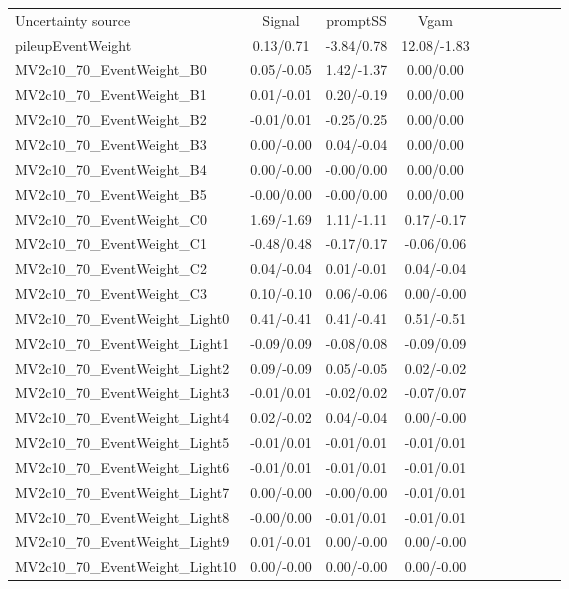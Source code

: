 \begin{table}[h]
\scriptsize
\begin{center}
\begin{tabular}{l|ccccccccc}
\hline
\hline
Uncertainty source &Signal &promptSS &Vgam \\
pileupEventWeight &0.13/0.71 &-3.84/0.78 &12.08/-1.83 \\
MV2c10\_70\_EventWeight\_B0 &0.05/-0.05 &1.42/-1.37 &0.00/0.00 \\
MV2c10\_70\_EventWeight\_B1 &0.01/-0.01 &0.20/-0.19 &0.00/0.00 \\
MV2c10\_70\_EventWeight\_B2 &-0.01/0.01 &-0.25/0.25 &0.00/0.00 \\
MV2c10\_70\_EventWeight\_B3 &0.00/-0.00 &0.04/-0.04 &0.00/0.00 \\
MV2c10\_70\_EventWeight\_B4 &0.00/-0.00 &-0.00/0.00 &0.00/0.00 \\
MV2c10\_70\_EventWeight\_B5 &-0.00/0.00 &-0.00/0.00 &0.00/0.00 \\
MV2c10\_70\_EventWeight\_C0 &1.69/-1.69 &1.11/-1.11 &0.17/-0.17 \\
MV2c10\_70\_EventWeight\_C1 &-0.48/0.48 &-0.17/0.17 &-0.06/0.06 \\
MV2c10\_70\_EventWeight\_C2 &0.04/-0.04 &0.01/-0.01 &0.04/-0.04 \\
MV2c10\_70\_EventWeight\_C3 &0.10/-0.10 &0.06/-0.06 &0.00/-0.00 \\
MV2c10\_70\_EventWeight\_Light0 &0.41/-0.41 &0.41/-0.41 &0.51/-0.51 \\
MV2c10\_70\_EventWeight\_Light1 &-0.09/0.09 &-0.08/0.08 &-0.09/0.09 \\
MV2c10\_70\_EventWeight\_Light2 &0.09/-0.09 &0.05/-0.05 &0.02/-0.02 \\
MV2c10\_70\_EventWeight\_Light3 &-0.01/0.01 &-0.02/0.02 &-0.07/0.07 \\
MV2c10\_70\_EventWeight\_Light4 &0.02/-0.02 &0.04/-0.04 &0.00/-0.00 \\
MV2c10\_70\_EventWeight\_Light5 &-0.01/0.01 &-0.01/0.01 &-0.01/0.01 \\
MV2c10\_70\_EventWeight\_Light6 &-0.01/0.01 &-0.01/0.01 &-0.01/0.01 \\
MV2c10\_70\_EventWeight\_Light7 &0.00/-0.00 &-0.00/0.00 &-0.01/0.01 \\
MV2c10\_70\_EventWeight\_Light8 &-0.00/0.00 &-0.01/0.01 &-0.01/0.01 \\
MV2c10\_70\_EventWeight\_Light9 &0.01/-0.01 &0.00/-0.00 &0.00/-0.00 \\
MV2c10\_70\_EventWeight\_Light10 &0.00/-0.00 &0.00/-0.00 &0.00/-0.00 \\

\end{tabular}
\end{center}
\end{table}
